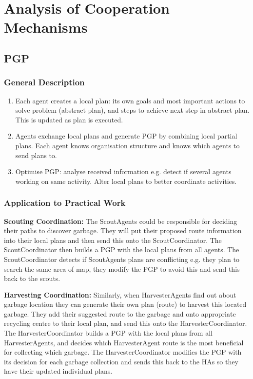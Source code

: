 \section{Analysis of Cooperation Mechanisms}
\label{sec:allCoop}




\subsection{PGP}

\subsubsection{General Description}

\begin{enumerate}
	\item Each agent creates a local plan: its own goals and most important actions to solve problem (abstract plan), and steps to achieve next step in abstract plan. This is updated as plan is executed.
	\item Agents exchange local plans and generate PGP by combining local partial plans. Each agent knows organisation structure and knows which agents to send plans to.
	\item Optimise PGP: analyse received information e.g. detect if several agents working on same activity. Alter local plans to better coordinate activities.

\end{enumerate}

\subsubsection{Application to Practical Work}

\textbf{Scouting Coordination:} The ScoutAgents could be responsible for deciding their paths to discover garbage. They will put their proposed route information into their local plans and then send this onto the ScoutCoordinator. The ScoutCoordinator then builds a PGP with the local plans from all agents. The ScoutCoordinator detects if ScoutAgents plans are conflicting e.g. they plan to search the same area of map, they modify the PGP to avoid this and send this back to the scouts. 

\textbf{Harvesting Coordination:} Similarly, when HarvesterAgents find out about garbage location they can generate their own plan (route) to harvest this located garbage. They add their suggested route to the garbage and onto appropriate recycling centre to their local plan, and send this onto the HarvesterCoordinator. The HarvesterCoordinator builds a PGP with the local plans from all HarvesterAgents, and decides which HarvesterAgent route is the most beneficial for collecting which garbage. The HarvesterCoordinator modifies the PGP with its decision for each garbage collection and sends this back to the HAs so they have their updated individual plans. 

